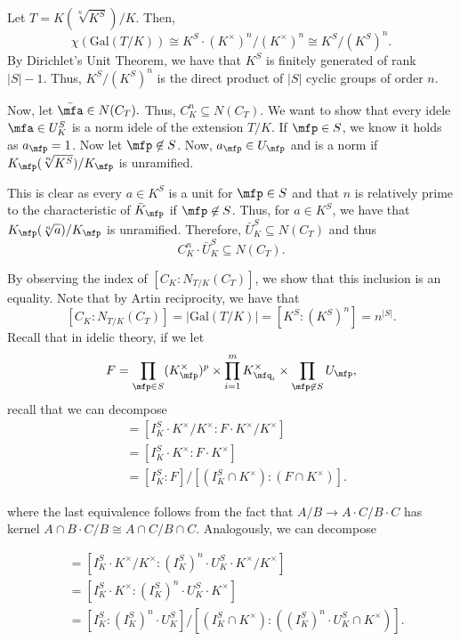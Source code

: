 \documentclass[a4paper, 12pt,oneside,openany]{book}
\begin{document}
 Let $T =K(\sqrt[n]{K^S})/K$. Then, $$\chi(\text{Gal}(T/K)) \cong K^S \cdot (K^\times)^n/(K^\times)^n \cong K^S / (K^S)^n.$$ By Dirichlet's Unit Theorem, we have that $K^S$ is finitely generated of rank $|S|-1$. Thus, $K^S / (K^S)^n$ is the direct product of $|S|$ cyclic groups of order $n$. 

Now, let $\bar{\mfa} \in N(C_T).$ Thus, $C_K^n \subseteq N(C_T)$. We want to show that every idele $\mfa \in U_K^S$ is a norm idele of the extension $T/K$. If $\mfp\in S$, we know it holds as $a_\mfp = 1$. Now let $\mfp \not\in S$. Now, $a_\mfp \in U_\mfp$ and is a norm if $K_\mfp(\sqrt[n]{K^S})/K_\mfp$ is unramified. 

This is clear as every $a \in K^S$ is a unit for $\mfp \in S$ and that $n$ is relatively prime to the characteristic of $\bar{K}_\mfp$ if $\mfp \not\in S$. Thus, for $a \in K^S$, we have that $K_\mfp(\sqrt[n]{a})/K_\mfp$ is unramified. Therefore, $\bar{U}_K^S \subseteq N(C_T)$ and thus $$C_K^n \cdot \bar{U}_K^S \subseteq N(C_T).$$

By observing the index of $[C_K: N_{T/K}(C_T)]$, we show that this inclusion is an equality. Note that by Artin reciprocity, we have that $$[C_K: N_{T/K}(C_T)]= |\text{Gal}(T/K)| = [K^S: (K^S)^n] = n^{|S|}.$$ Recall that in idelic theory, if we let $$F = \prod\limits_{\mfp \in S} (K^\times_\mfp)^p \times \prod\limits_{i=1}^m K_{\mfq_i}^\times \times \prod\limits_{\mfp \not\in S} U_\mfp,$$ recall that we can decompose
 \begin{align*}[C_K:\bar{F}] &= [I_K^{S} \cdot K^\times / K^\times : F\cdot K^\times / K^\times] \\ 
 	&=  [I_K^{S} \cdot K^\times  : F\cdot K^\times]  \\
	&= [I_K^{S}:F] / [(I_K^{S} \cap K^\times):(F \cap K^\times)].
 \end{align*}

where the last equivalence follows from the fact that $A/B \to A\cdot C / B \cdot C$ has kernel $A \cap B\cdot C / B \cong A \cap C / B \cap C$. Analogously, we can decompose 

 \begin{align*}[C_K:C_K^n \cdot \bar{U}_K^S] &= [I_K^{S} \cdot K^\times / K^\times : (I_K^S)^n \cdot U_K^S\cdot K^\times / K^\times] \\ 
 	&=  [I_K^{S} \cdot K^\times  : (I_K^S)^n \cdot U_K^S\cdot K^\times]  \\
	&= [I_K^{S}:(I_K^S)^n \cdot U_K^S] / [(I_K^{S} \cap K^\times):((I_K^S)^n \cdot U_K^S \cap K^\times)].
 \end{align*}
\end{document}
